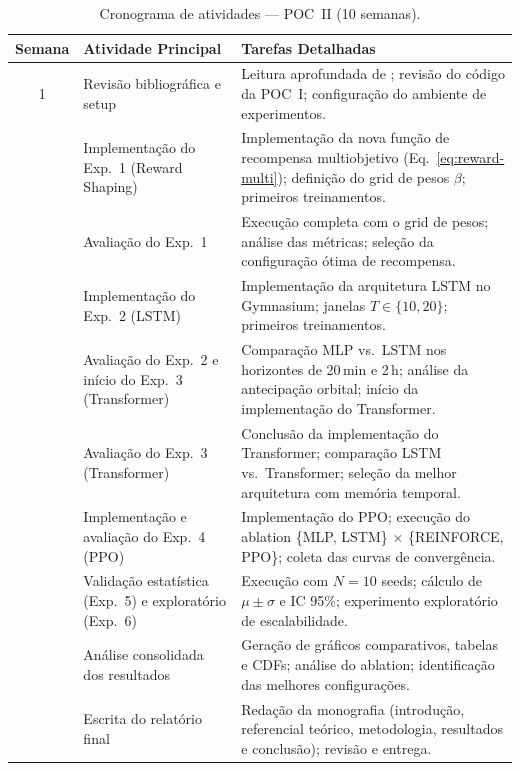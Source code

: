 \documentclass[12pt,a4paper]{article}
\begin{document}
\begin{table}[H]
  \centering
  \caption{Cronograma de atividades --- POC~II (10 semanas).}
  \label{tab:cronograma}
  \begin{tabularx}{\textwidth}{cp{4.5cm}p{7.5cm}}
    \toprule
    \textbf{Semana} & \textbf{Atividade Principal} & \textbf{Tarefas Detalhadas} \\
    \midrule
    1
    & Revisão bibliográfica e setup
    & Leitura aprofundada de \cite{song2025,fan2025,schulman2017,henderson2018,wu2025,vaswani2017};
      revisão do código da POC~I; configuração do ambiente de experimentos. \\
    \addlinespace
    2
    & Implementação do Exp.~1 (Reward Shaping)
    & Implementação da nova função de recompensa multiobjetivo (Eq.~\ref{eq:reward-multi});
      definição do grid de pesos $\beta$; primeiros treinamentos. \\
    \addlinespace
    3
    & Avaliação do Exp.~1
    & Execução completa com o grid de pesos; análise das métricas;
      seleção da configuração ótima de recompensa. \\
    \addlinespace
    4
    & Implementação do Exp.~2 (LSTM)
    & Implementação da arquitetura LSTM no Gymnasium;
      janelas $T \in \{10, 20\}$; primeiros treinamentos. \\
    \addlinespace
    5
    & Avaliação do Exp.~2 e início do Exp.~3 (Transformer)
    & Comparação MLP vs.\ LSTM nos horizontes de 20\,min e 2\,h;
      análise da antecipação orbital; início da implementação do Transformer. \\
    \addlinespace
    6
    & Avaliação do Exp.~3 (Transformer)
    & Conclusão da implementação do Transformer;
      comparação LSTM vs.\ Transformer;
      seleção da melhor arquitetura com memória temporal. \\
    \addlinespace
    7
    & Implementação e avaliação do Exp.~4 (PPO)
    & Implementação do PPO; execução do ablation \{MLP, LSTM\} $\times$ \{REINFORCE, PPO\};
      coleta das curvas de convergência. \\
    \addlinespace
    8
    & Validação estatística (Exp.~5) e exploratório (Exp.~6)
    & Execução com $N=10$ seeds; cálculo de $\mu \pm \sigma$ e IC 95\%;
      experimento exploratório de escalabilidade. \\
    \addlinespace
    9
    & Análise consolidada dos resultados
    & Geração de gráficos comparativos, tabelas e CDFs;
      análise do ablation; identificação das melhores configurações. \\
    \addlinespace
    10
    & Escrita do relatório final
    & Redação da monografia (introdução, referencial teórico, metodologia,
      resultados e conclusão); revisão e entrega. \\
    \bottomrule
  \end{tabularx}
\end{table}
\end{document}
